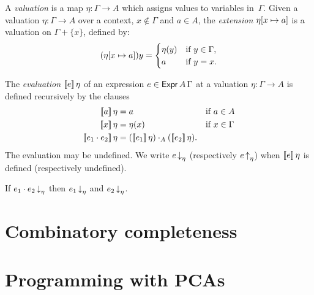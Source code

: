 \begin{definition}
  \label{def:Valuation}
  A \emph{valuation} is a map $\eta : \Gamma \to A$ which assigns values to variables in~$\Gamma$.
  Given a valuation $\eta : \Gamma \to A$ over a context, $x \not\in \Gamma$ and $a \in A$, the
  \emph{extension} $\eta[x \mapsto a]$ is a valuation on $\Gamma + \{x\}$, defined by:
  \begin{equation*}
    (\eta[x \mapsto a]) y =
    \begin{cases}
      \eta(y) &\text{if $y \in \Gamma$,}\\
      a       &\text{if $y = x$.}
    \end{cases}
  \end{equation*}
\end{definition}

\begin{definition}
  \label{def:Expr.eval}
  \leanok
  The \emph{evaluation} $[\![ e ]\!] \, \eta$ of an expression $e \in \mathsf{Expr}\,A\,\Gamma$ at a
  valuation $\eta : \Gamma \to A$ is defined recursively by the clauses
  \begin{align*}
    \eval{a}{\eta} &= a        &&\text{if $a \in A$}\\
    \eval{x}{\eta} &= \eta(x)  &&\text{if $x \in \Gamma$}\\
    \eval{e_1 \cdot e_2}{\eta} &= (\eval{e_1} \eta) \cdot_A (\eval{e_2} \eta).
  \end{align*}
  The evaluation may be undefined. We write $e\,{\downarrow}_\eta$ (respectively $e\,{\uparrow}_\eta$) when $[\![ e ]\!] \, \eta$ is defined (respectively undefined).
\end{definition}

\begin{proposition}
  \label{prop:Expr.defined}
  \leanok
  If $e_1 \cdot e_2\,{\downarrow}_\eta$ then $e_1\,{\downarrow}_\eta$ and $e_2\,{\downarrow}_\eta$.
\end{proposition}

\chapter{Combinatory completeness}


\chapter{Programming with PCAs}
